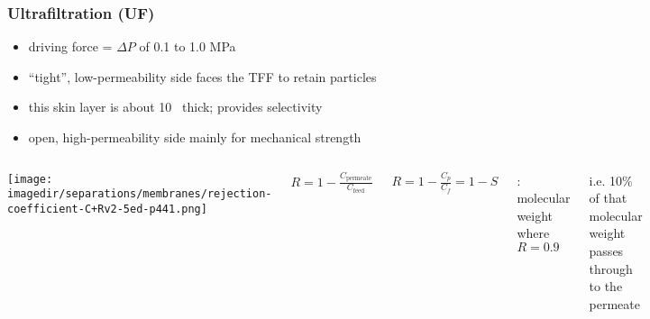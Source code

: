\begin{frame}\frametitle{Ultrafiltration (UF)}
	
	\begin{itemize}		
		\item	driving force = $\Delta P$ of 0.1 to 1.0 MPa %
		\item	``tight'', low-permeability side faces the TFF to retain particles
		\item	this skin layer is about 10\micron~ thick; provides selectivity 
		\item	open, high-permeability side mainly for mechanical strength %
	\end{itemize}
	
	\begin{columns}[t]
			\vspace{-12pt}
			\begin{center}
				\texttt{[image: \\imagedir/separations/membranes/rejection-coefficient-C+Rv2-5ed-p441.png]}
			\end{center}
			\vspace{-12pt}
		
			$R = 1 -\displaystyle \frac{C_\text{permeate}}{C_\text{feed}}$
			
			$R = 1- \displaystyle \frac{C_p}{C_f} = 1 -S$
			
			\vspace{12pt}
			{\color{purple}{MWCO}}: molecular weight where $R=0.9$
			
			\vspace{12pt}
			i.e. 10\% of that molecular weight passes through to the permeate
	\end{columns}	
\end{frame}

